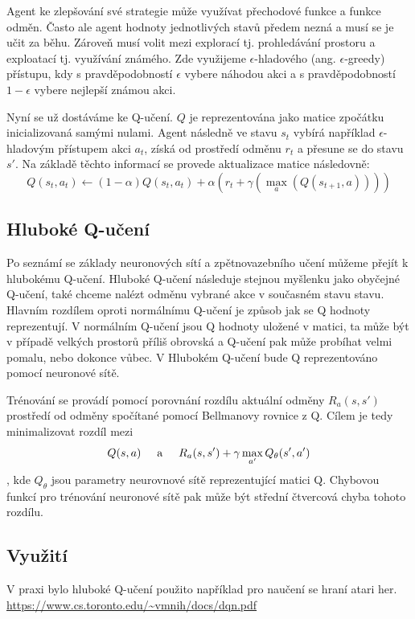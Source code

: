 Agent ke zlepšování své strategie může využívat přechodové funkce a funkce odměn. Často ale agent hodnoty jednotlivých stavů předem nezná a musí se je učit za běhu.
Zároveň musí volit mezi explorací tj. prohledávání prostoru a exploatací tj. využívání známého. Zde využijeme $\epsilon$-hladového (ang. $\epsilon$-greedy) přístupu, kdy s pravděpodobností $\epsilon$ vybere náhodou akci a s pravděpodobností $1-\epsilon$ vybere nejlepší známou akci.

Nyní se už dostáváme ke Q-učení. $Q$ je reprezentována jako matice zpočátku inicializovaná samými nulami. Agent následně ve stavu $s_t$ vybírá například $\epsilon$-hladovým přístupem akci $a_t$, získá od prostředí odměnu $r_t$ a přesune se do stavu $s'$.
Na základě těchto informací se provede aktualizace matice následovně:
\newline
\[Q(s_t,a_t) \leftarrow (1-\alpha)Q(s_t,a_t) + \alpha(r_t + \gamma(\max_a(Q(s_{t+1},a))))\]




\subsection{Hluboké Q-učení}
Po seznámí se základy neuronových sítí a zpětnovazebního učení můžeme přejít k hlubokému Q-učení.
Hluboké Q-učení následuje stejnou myšlenku jako obyčejné Q-učení, také chceme nalézt odměnu vybrané akce v současném stavu stavu.
Hlavním rozdílem oproti normálnímu Q-učení je způsob jak se Q hodnoty reprezentují. V normálním Q-učení jsou Q hodnoty uložené v matici, ta může být v případě velkých prostorů příliš obrovská a Q-učení pak může probíhat velmi pomalu, nebo dokonce vůbec.
V Hlubokém Q-učení bude Q reprezentováno pomocí neuronové sítě.

Trénování se provádí pomocí porovnání rozdílu aktuální odměny $R_a(s,s')$ prostředí od odměny spočítané pomocí Bellmanovy rovnice z Q.
Cílem je tedy minimalizovat rozdíl mezi \[Q(s,a) \hspace{5mm}\text{a}\hspace{5mm}  R_a(s,s') + \gamma\max_{a'}Q_{\theta}(s',a')\], kde $Q_{\theta}$ jsou parametry neurovnové sítě reprezentující matici Q.
Chybovou funkcí pro trénování neuronové sítě pak může být střední čtvercová chyba tohoto rozdílu.



\subsection{Využití}
V praxi bylo hluboké Q-učení použito například pro naučení se hraní atari her. 
\url{https://www.cs.toronto.edu/~vmnih/docs/dqn.pdf}

